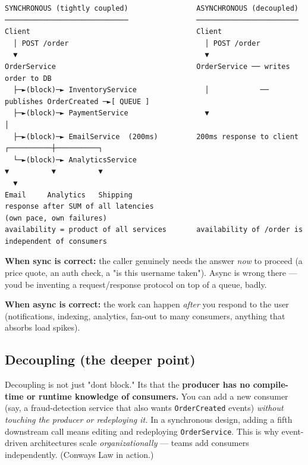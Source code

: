 \documentclass[11pt]{article}
\begin{document}
\begin{verbatim}
SYNCHRONOUS (tightly coupled)                ASYNCHRONOUS (decoupled)
─────────────────────────────                ────────────────────────
Client                                       Client
  │ POST /order                                │ POST /order
  ▼                                            ▼
OrderService                                 OrderService ── writes order to DB
  ├─►(block)─► InventoryService                │            ── publishes OrderCreated ─►[ QUEUE ]
  ├─►(block)─► PaymentService                  ▼                                            │
  ├─►(block)─► EmailService  (200ms)         200ms response to client            ┌──────────┼──────────┐
  └─►(block)─► AnalyticsService                                                  ▼          ▼          ▼
  ▼                                                                          Email     Analytics   Shipping
response after SUM of all latencies                                        (own pace, own failures)
availability = product of all services       availability of /order is independent of consumers
\end{verbatim}

\textbf{When sync is correct:} the caller genuinely needs the answer \emph{now} to proceed (a price quote, an auth check, a "is this username taken"). Async is wrong there --- you\textquotesingle d be inventing a request/response protocol on top of a queue, badly.

\textbf{When async is correct:} the work can happen \emph{after} you respond to the user (notifications, indexing, analytics, fan-out to many consumers, anything that absorbs load spikes).

\subsection{Decoupling (the deeper point)}\label{decoupling-the-deeper-point}

Decoupling is not just "don\textquotesingle t block." It\textquotesingle s that the \textbf{producer has no compile-time or runtime knowledge of consumers.} You can add a new consumer (say, a fraud-detection service that also wants \texttt{OrderCreated} events) \emph{without touching the producer or redeploying it.} In a synchronous design, adding a fifth downstream call means editing and redeploying \texttt{OrderService}. This is why event-driven architectures scale \emph{organizationally} --- teams add consumers independently. (Conway\textquotesingle s Law in action.)
\end{document}
